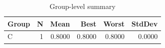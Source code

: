 \begin{table}[htbp]
\centering
\caption{Group-level summary}
\label{tab:group-summary}
\begin{tabular}{lrrrrr}
\toprule
\textbf{Group} & \textbf{N} & \textbf{Mean} & \textbf{Best} & \textbf{Worst} & \textbf{StdDev} \\
\midrule
C & 1 & 0.8000 & 0.8000 & 0.8000 & 0.0000 \\
\bottomrule
\end{tabular}
\end{table}